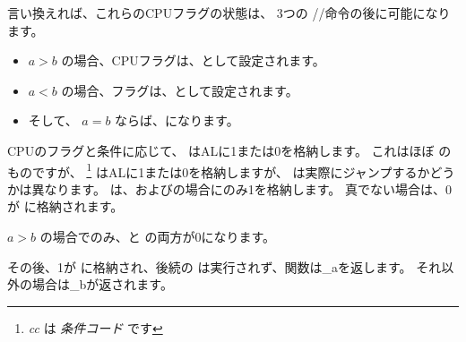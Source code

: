 言い換えれば、これらのCPUフラグの状態は、
3つの \FUCOMPP/\FNSTSW/\SAHF 命令の後に可能になります。

\begin{itemize}
\item $a>b$ の場合、CPUフラグは、として設定されます。
\item $a<b$ の場合、フラグは、として設定されます。
\item そして、 $a=b$ ならば、になります。
\end{itemize}


CPUのフラグと条件に応じて、 \SETNBE はALに1または0を格納します。 
これはほぼ \JNBE のものですが、 \SETcc
\footnote{\emph{cc} は \emph{条件コード} です}
はALに1または0を格納しますが、 \Jcc は実際にジャンプするかどうかは異なります。
\SETNBE は、およびの場合にのみ1を格納します。 
真でない場合は、0が \AL に格納されます。

$a>b$ の場合でのみ、\CF と \ZF の両方が0になります。

その後、1が \AL に格納され、後続の \JZ は実行されず、関数は{\_a}を返します。 
それ以外の場合は{\_b}が返されます。
